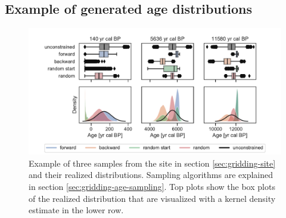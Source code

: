 \begin{refsection}
\begin{subappendices}
	\section{Example of generated age distributions} \label{sec:gridding-suppl-age-example-distributions}
		\begin{figure}[!h]
			\includegraphics[width=\linewidth]{gridding-figures/age-sampling-methods-use-case.pdf}
			\caption[Example of sampled distribution]{Example of three samples from the site in section \ref{sec:gridding-site} and their realized distributions. Sampling algorithms are explained in section \ref{sec:gridding-age-sampling}. Top plots show the box plots of the realized distribution that are visualized with a kernel density estimate in the lower row.}
			\label{fig:gridding-age-example-distributions}
		\end{figure}

\end{subappendices}

\printbibliography[heading=subbibintoc]

\end{refsection}